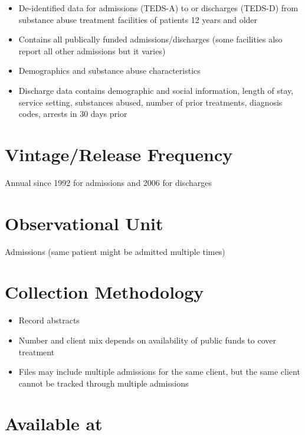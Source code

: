\documentclass[
]{book}
\providecommand{\tightlist}{%
  \setlength{\itemsep}{0pt}\setlength{\parskip}{0pt}}
\begin{document}
\begin{itemize}
\tightlist
\item
  De-identified data for admissions (TEDS-A) to or discharges (TEDS-D) from substance abuse treatment facilities of patients 12 years and older
\item
  Contains all publically funded admissions/discharges (some facilities also report all other admissions but it varies)
\item
  Demographics and substance abuse characteristics
\item
  Discharge data contains demographic and social information, length of stay, service setting, substances abused, number of prior treatments, diagnosis codes, arrests in 30 days prior
\end{itemize}

\hypertarget{vintagerelease-frequency-90}{%
\section{Vintage/Release Frequency}\label{vintagerelease-frequency-90}}

Annual since 1992 for admissions and 2006 for discharges

\hypertarget{observational-unit-90}{%
\section{Observational Unit}\label{observational-unit-90}}

Admissions (same patient might be admitted multiple times)

\hypertarget{collection-methodology-90}{%
\section{Collection Methodology}\label{collection-methodology-90}}

\begin{itemize}
\tightlist
\item
  Record abstracts
\item
  Number and client mix depends on availability of public funds to cover treatment
\item
  Files may include multiple admissions for the same client, but the same client cannot be tracked through multiple admissions
\end{itemize}

\hypertarget{available-at-90}{%
\section{Available at}\label{available-at-90}}
\end{document}
